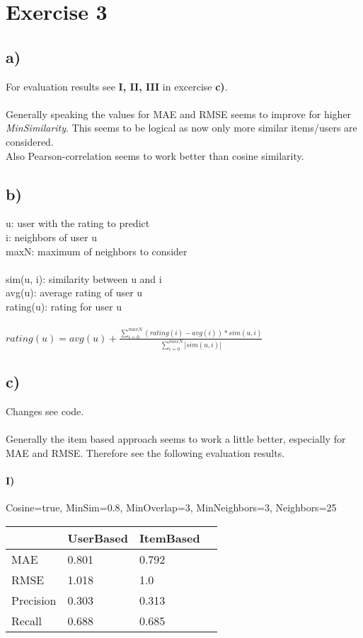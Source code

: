 \documentclass{article}
\begin{document}
\vspace{2cm}
\section*{Exercise 3}
\subsection*{a)}
For evaluation results see \textbf{I, II, III} in excercise \textbf{c)}.\\\\
Generally speaking the values for MAE and RMSE seems to improve for higher
\textit{MinSimilarity}. This seems to be logical as now only more similar
items/users are considered.\\
Also Pearson-correlation seems to work better than cosine similarity.

\subsection*{b)}
u: user with the rating to predict\\
i: neighbors of user u\\
maxN: maximum of neighbors to consider \\
\\
sim(u, i): similarity between u and i\\
avg(u): average rating of user u\\
rating(u): rating for user u\\
\\
$
rating(u) = avg(u) + \frac{\sum\limits_{i=0}^{maxN} (rating(i) - avg(i)) *
sim(u, i)} {\sum\limits_{i=0}^{maxN} |sim(u, i) | }
$

\subsection*{c)}
Changes see code.\\
\\
Generally the item based approach seems to work a little better, especially for
MAE and RMSE. Therefore see the following evaluation results.
\vspace{1cm}\\
\paragraph{I)}
Cosine=true, MinSim=0.8, MinOverlap=3, MinNeighbors=3, Neighbors=25\\
\begin{tabular}{| l | l | l | l |}
  \hline          
& UserBased & ItemBased  \\\hline
MAE & 0.801 & 0.792 \\
RMSE & 1.018 & 1.0 \\
Precision & 0.303 & 0.313 \\
Recall & 0.688 & 0.685 \\
  \hline  
\end{tabular}
\vspace{1cm}\\
\end{document}

